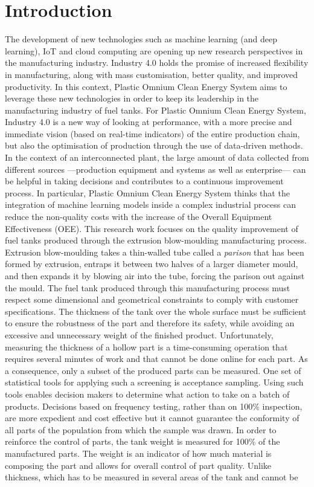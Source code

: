 \chapter*{Introduction}


The development of new technologies such as machine learning (and deep learning), IoT and cloud computing are opening up new research perspectives in the manufacturing industry. Industry 4.0 holds the promise of increased flexibility in manufacturing, along with mass customisation, better quality, and improved productivity. In this context, Plastic Omnium Clean Energy System aims to leverage these new technologies in order to keep its leadership in the manufacturing industry of fuel tanks. For Plastic Omnium Clean Energy System, Industry 4.0 is a new way of looking at performance, with a more precise and immediate vision (based on real-time indicators) of the entire production chain, but also the optimisation of production through the use of data-driven methods. In the context of an interconnected plant, the large amount of data collected from different sources —production equipment and systems as well as enterprise— can be helpful in taking decisions and contributes to a continuous improvement process. In particular, Plastic Omnium Clean Energy System thinks that the integration of machine learning models inside a complex industrial process can reduce the non-quality costs with the increase of the Overall Equipment Effectiveness (OEE). This research work focuses on the quality improvement of fuel tanks produced through the extrusion blow-moulding manufacturing process. Extrusion blow-moulding takes a thin-walled tube called a \textit{parison} that has been formed by extrusion, entraps it between two halves of a larger diameter mould, and then expands it by blowing air into the tube, forcing the parison out against the mould. The fuel tank produced through this manufacturing process must respect some dimensional and geometrical constraints to comply with customer specifications. The thickness of the tank over the whole surface must be sufficient to ensure the robustness of the part and therefore its safety, while avoiding an excessive and unnecessary weight of the finished product. Unfortunately, measuring the thickness of a hollow part is a time-consuming operation that requires several minutes of work and that cannot be done online for each part. As a consequence, only a subset of the produced parts can be measured. One set of statistical tools for applying such a screening is acceptance sampling. Using such tools enables decision makers to determine what action to take on a batch of products. Decisions based on frequency testing, rather than on 100\% inspection, are more expedient and cost effective but it cannot guarantee the conformity of all parts of the population from which the sample was drawn. In order to reinforce the control of parts, the tank weight is measured for 100\% of the manufactured parts. The weight is an indicator of how much material is composing the part and allows for overall control of part quality. Unlike thickness, which has to be measured in several areas of the tank and cannot be 